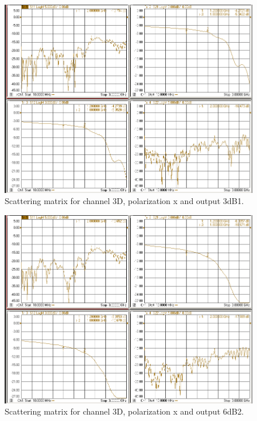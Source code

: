 \documentclass[12pt,a4paper,oneside]{article}
\begin{document}
\begin{figure}[H]
\centering
\includegraphics[width=0.9\linewidth]{VNA_results/3Dx_3dB1.png}
\caption{Scattering matrix for channel 3D, polarization x and output 3dB1.}
\label{fig:3Dx_3dB1}
\end{figure}


\begin{figure}[H]
\centering
\includegraphics[width=0.9\linewidth]{VNA_results/3Dx_6dB2.png}
\caption{Scattering matrix for channel 3D, polarization x and output 6dB2.}
\label{fig:3Dx_6dB2}
\end{figure}
\end{document}
